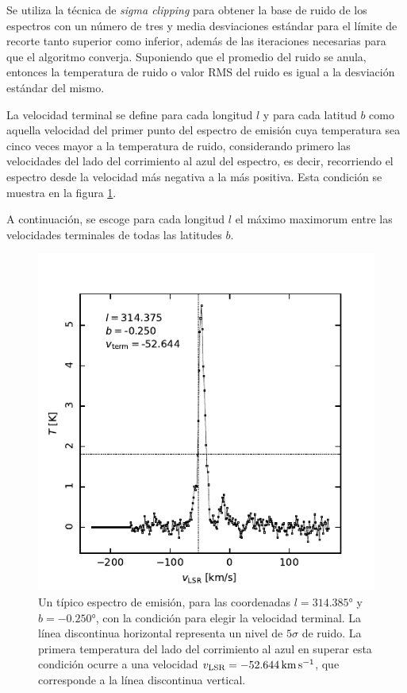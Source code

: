 Se utiliza la técnica de \textit{sigma clipping} para obtener la base de ruido de los espectros con un número de tres y media desviaciones estándar para el límite de recorte tanto superior como inferior, además de las iteraciones necesarias para que el algoritmo converja. Suponiendo que el promedio del ruido se anula, entonces la temperatura de ruido o valor RMS del ruido es igual a la desviación estándar del mismo.

La velocidad terminal se define para cada longitud $l$ y para cada latitud $b$ como aquella velocidad del primer punto del espectro de emisión cuya temperatura sea cinco veces mayor a la temperatura de ruido, considerando primero las velocidades del lado del corrimiento al azul del espectro, es decir, recorriendo el espectro desde la velocidad más negativa a la más positiva. Esta condición se muestra en la figura \ref{fig:vterminal}.

A continuación, se escoge para cada longitud $l$ el máximo maximorum entre las velocidades terminales de todas las latitudes $b$.

\begin{figure}[htbp]
	\includegraphics{rsc/vterminal.pdf}
	\caption{Un típico espectro de emisión, para las coordenadas $l=\ang{314.385}$ y $b=\ang{-0.250}$, con la condición para elegir la velocidad terminal. La línea discontinua horizontal representa un nivel de $5\sigma$ de ruido. La primera temperatura del lado del corrimiento al azul en superar esta condición ocurre a una velocidad $v_\textnormal{LSR}=\SI{-52.644}{\kilo\metre\per\second}$, que corresponde a la línea discontinua vertical.}
	\label{fig:vterminal}
\end{figure}

